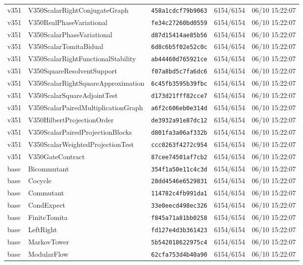 \documentclass[11pt]{article}
\theoremstyle{definition}\newtheorem{deriv}{Derivação}
\begin{document}
{\begin{longtable}{@{}lllll@{}}
v351 & V350ScalarRightConjugateGraph & \texttt{458a1cdcf79b9063} & 6154/6154 & 06/10 15:22:07 \\
v351 & V350RealPhaseVariational & \texttt{fe34c27260bd0559} & 6154/6154 & 06/10 15:22:07 \\
v351 & V350ScalarPhaseVariational & \texttt{d87d15414ae85b56} & 6154/6154 & 06/10 15:22:07 \\
v351 & V350ScalarTomitaBidual & \texttt{6d8c6b5f02e52c0c} & 6154/6154 & 06/10 15:22:07 \\
v351 & V350ScalarRightFunctionalStability & \texttt{ab44460d765921ce} & 6154/6154 & 06/10 15:22:07 \\
v351 & V350SquareResolventSupport & \texttt{f07a8bd5c7fa6dc6} & 6154/6154 & 06/10 15:22:07 \\
v351 & V350ScalarRightSquareApproximation & \texttt{6c45fb3595b39fbc} & 6154/6154 & 06/10 15:22:07 \\
v351 & V350ScalarSquareAdjointTest & \texttt{d173d21fff82cce7} & 6154/6154 & 06/10 15:22:07 \\
v351 & V350ScalarPairedMultiplicationGraph & \texttt{a6f2c606eb0e314d} & 6154/6154 & 06/10 15:22:07 \\
v351 & V350HilbertProjectionOrder & \texttt{de3932a91e87dc12} & 6154/6154 & 06/10 15:22:07 \\
v351 & V350ScalarPairedProjectionBlocks & \texttt{d801fa3a06af332b} & 6154/6154 & 06/10 15:22:07 \\
v351 & V350ScalarWeightedProjectionTest & \texttt{ccc0263f4272c954} & 6154/6154 & 06/10 15:22:07 \\
v351 & V350GateContract & \texttt{87cee74501af7cb2} & 6154/6154 & 06/10 15:22:07 \\
base & Bicommutant & \texttt{354f1a50e11c4c3d} & 6154/6154 & 06/10 15:22:07 \\
base & Cocycle & \texttt{28dd4546e6529831} & 6154/6154 & 06/10 15:22:07 \\
base & Commutant & \texttt{114782c4fb991da1} & 6154/6154 & 06/10 15:22:07 \\
base & CondExpect & \texttt{33e0eecd498ec326} & 6154/6154 & 06/10 15:22:07 \\
base & FiniteTomita & \texttt{f845a71a81bb0258} & 6154/6154 & 06/10 15:22:07 \\
base & LeftRight & \texttt{fd127e4d3b361423} & 6154/6154 & 06/10 15:22:07 \\
base & MarkovTower & \texttt{5b542018622975c4} & 6154/6154 & 06/10 15:22:07 \\
base & ModularFlow & \texttt{62cfa753d4b40a90} & 6154/6154 & 06/10 15:22:07 \\

\end{longtable}}
\end{document}
